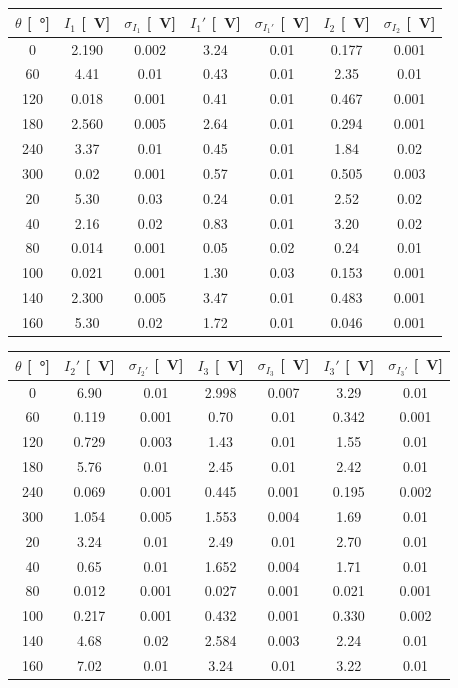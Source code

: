 \documentclass[10pt,oneside,a4paper]{article}
\begin{document}
\begin{center}
\label{tab:ultima}
\begin{tabular}{c|c|c|c|c|c|c}
\toprule
$\theta$ [\SI{}{\degree}] & $I_1$ [\SI{}{V}] & $\sigma_{I_1}$ [\SI{}{V}] & $I_1'$ [\SI{}{V}] & $\sigma_{I_1'}$ [\SI{}{V}] & $I_2$ [\SI{}{V}] & $\sigma_{I_2}$ [\SI{}{V}]   \\
\midrule
  0  & 2.190 & 0.002 & 3.24 & 0.01 & 0.177 & 0.001 		\\		
  60 & 4.41 & 0.01 & 0.43 & 0.01 & 2.35 & 0.01 			\\		
 120 & 0.018 & 0.001 & 0.41 & 0.01 & 0.467 	& 0.001 	\\		
 180 & 2.560 & 0.005 & 2.64 & 0.01 	& 0.294 & 0.001 	\\		
 240 & 3.37 & 0.01 & 0.45 & 0.01 & 1.84 & 0.02 			\\		
 300 & 0.02 & 0.001 & 0.57 & 0.01 & 0.505 & 0.003 		\\		
  20 & 5.30 & 0.03 & 0.24 & 0.01 & 2.52 & 0.02 			\\		
  40 & 2.16 & 0.02 & 0.83 & 0.01 & 3.20 & 0.02 			\\		
  80 & 0.014 & 0.001 & 0.05 & 0.02 & 0.24 & 0.01 		\\		
 100 & 0.021 & 0.001 & 1.30 & 0.03 & 0.153 & 0.001 		\\		
 140 & 2.300 & 0.005 & 3.47 & 0.01 & 0.483 & 0.001 		\\		
 160 & 5.30 & 0.02 & 1.72 & 0.01 & 0.046 & 0.001 		\\		
 \bottomrule
\end{tabular}

\vspace*{0.4cm}
\centering
\begin{tabular}{c|c|c|c|c|c|c}
\toprule
$\theta$ [\SI{}{\degree}] & $I_2'$ [\SI{}{V}] & $\sigma_{I_2'}$ [\SI{}{V}] & $I_3$ [\SI{}{V}] & $\sigma_{I_3}$ [\SI{}{V}] & $I_3'$ [\SI{}{V}] & $\sigma_{I_3'}$ [\SI{}{V}] \\
\midrule
  0  & 6.90 & 0.01 & 2.998 & 0.007 & 3.29 & 0.01 \\
  60 & 0.119 & 0.001 & 0.70 & 0.01 & 0.342 & 0.001 \\
 120 & 0.729 & 0.003 & 1.43 & 0.01 & 1.55 & 0.01 \\
 180 & 5.76 & 0.01 & 2.45 & 0.01 & 2.42 & 0.01 \\
 240 & 0.069 & 0.001 & 0.445 & 0.001 & 0.195 & 0.002 \\
 300 & 1.054 & 0.005 & 1.553 & 0.004 & 1.69 & 0.01 \\
  20 & 3.24 & 0.01 & 2.49 & 0.01 & 2.70 & 0.01 \\
  40 & 0.65 & 0.01 & 1.652 & 0.004 & 1.71 & 0.01 \\
  80 & 0.012 & 0.001 & 0.027 & 0.001 & 0.021 & 0.001 \\
 100 & 0.217 & 0.001 & 0.432 & 0.001 & 0.330 & 0.002 \\
 140 & 4.68 & 0.02 & 2.584 & 0.003 & 2.24 & 0.01 \\
 160 & 7.02 & 0.01 & 3.24 & 0.01 & 3.22 & 0.01 \\
 \bottomrule
\end{tabular}
\end{center}
\end{document}
